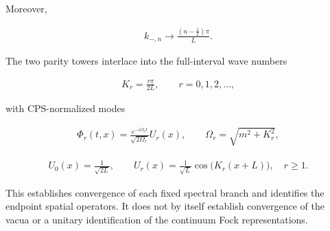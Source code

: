 Moreover,

\begin{align}
k_{-,n}\longrightarrow\frac{(n-\frac12)\pi}{L}.
\end{align}

The two parity towers interlace into the full-interval wave numbers

\begin{align}
K_r=\frac{r\pi}{2L},
\qquad
r=0,1,2,\ldots,
\end{align}

with CPS-normalized modes

\begin{align}
\Phi_r(t,x)
=\frac{e^{-i\Omega_rt}}{\sqrt{2\Omega_r}}U_r(x),
\qquad
\Omega_r=\sqrt{m^2+K_r^2},
\end{align}

\begin{align}
U_0(x)=\frac{1}{\sqrt{2L}},
\qquad
U_r(x)=\frac{1}{\sqrt L}\cos\bigl(K_r(x+L)\bigr),
\quad r\geq1.
\end{align}

This establishes convergence of each fixed spectral branch and identifies the endpoint spatial operators. It does not by itself establish convergence of the vacua or a unitary identification of the continuum Fock representations.
